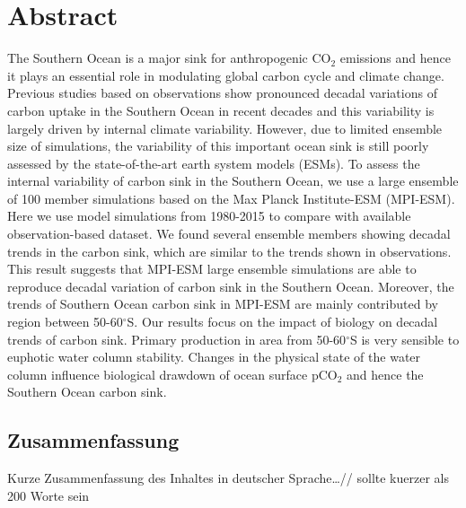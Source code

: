 \begingroup
\let\clearpage\relax
\let\cleardoublepage\relax
\let\cleardoublepage\relax

\chapter*{Abstract}

The Southern Ocean is a major sink for anthropogenic CO$_2$ emissions and hence it plays an essential role in modulating global carbon cycle and climate change. Previous studies based on observations show pronounced decadal variations of carbon uptake in the Southern Ocean in recent decades and this variability is largely driven by internal climate variability. However, due to limited ensemble size of simulations, the variability of this important ocean sink is still poorly assessed by the state-of-the-art earth system models (ESMs). To assess the internal variability of carbon sink in the Southern Ocean, we use a large ensemble of 100 member simulations based on the Max Planck Institute-ESM (MPI-ESM). Here we use model simulations from 1980-2015 to compare with available observation-based dataset. We found several ensemble members showing decadal trends in the carbon sink, which are similar to the trends shown in observations. This result suggests that MPI-ESM large ensemble simulations are able to reproduce decadal variation of carbon sink in the Southern Ocean. Moreover, the trends of Southern Ocean carbon sink in MPI-ESM are mainly contributed by region between 50-60$^\circ$S. %
Our results focus on the impact of biology on decadal trends of carbon sink. Primary production in area from 50-60$^\circ$S is very sensible to euphotic water column stability. Changes in the physical state of the water column influence biological drawdown of ocean surface pCO$_2$ and hence the Southern Ocean carbon sink.
  
\vfill

\begin{otherlanguage}{ngerman}
\chapter*{Zusammenfassung}
Kurze Zusammenfassung des Inhaltes in deutscher Sprache\dots // sollte kuerzer als 200 Worte sein
\end{otherlanguage}

\endgroup			

\vfill